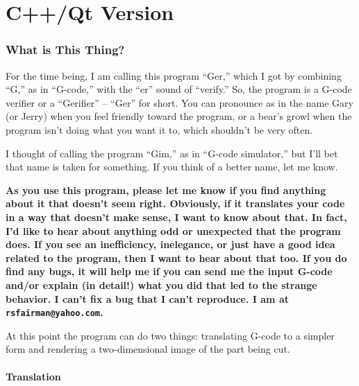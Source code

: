 \documentclass[titlepage,oneside,10pt]{article}
\begin{document}
\part{C++/Qt Version}







\newcommand{\ignoretext}[1]{}


\section{What is This Thing?}

For the time being, I am calling this program ``Ger,'' which I got by
combining ``G,'' as in ``G-code,'' with the ``er'' sound of
``verify.'' So, the program is a G-code verifier or a ``Gerifier'' --
``Ger'' for short. You can pronounce as in the name Gary (or Jerry)
when you feel friendly toward the program, or a bear's growl when the 
program isn't doing what you want it to, which shouldn't be very often.

I thought of calling the program ``Gim,'' as in ``G-code simulator,''
but I'll bet that name is taken for something. If you think of a better
name, let me know.

{\bf As you use this program, please let me know if you find anything
  about it that doesn't seem right. Obviously, if it translates your
  code in a way that doesn't make sense, I want to know about that. In
  fact, I'd like to hear about anything odd or unexpected that the
  program does. If you see an inefficiency, inelegance, or just have a
good idea related to the program, then I want to hear about that
too. If you do find any bugs, it will help me if you can
send me the input G-code and/or explain (in detail!) what you did that
led to the strange behavior. I can't fix a bug that I can't
reproduce. I am at {\tt rsfairman@yahoo.com}. }

At this point the program can do two things: translating G-code to a
simpler form and rendering a two-dimensional image of the part being
cut.

\subsection{Translation}
\end{document}
